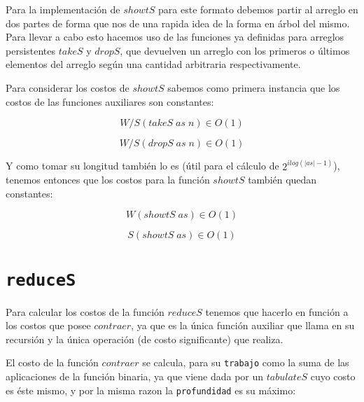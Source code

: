 \documentclass[a4paper,10pt]{article}
\begin{document}
    Para la implementación de $showtS$ para este formato debemos partir al arreglo
en dos partes de forma que nos de una rapida idea de la forma en árbol del mismo.
Para llevar a cabo esto hacemos uso de las funciones ya definidas para arreglos 
persistentes $takeS$ y $dropS$, que devuelven un arreglo con los primeros o últimos
elementos del arreglo según una cantidad arbitraria respectivamente.

    Para considerar los costos de $showtS$ sabemos como primera instancia que los
costos de las funciones auxiliares son constantes:

\begin{equation*}
    W/S \left( takeS\; as\; n \right) \in 
    O \left( 1 \right)
\end{equation*}

\begin{equation*}
    W/S \left( dropS\; as\; n \right) \in 
    O \left( 1 \right)
\end{equation*}

\bigskip
   
    Y como tomar su longitud también lo es (útil para el cálculo de 
$2^{ilog(\vert as \vert -1)}$), tenemos entonces que los costos para la función
$showtS$ también quedan constantes:

\begin{equation*}
    W \left( showtS\; as \right) \in O \left( 1 \right)
\end{equation*}

\begin{equation*}
    S \left( showtS\; as \right) \in O \left( 1 \right)
\end{equation*}


\bigskip
    

\section*{\texttt{reduceS}}

    Para calcular los costos de la función $reduceS$ tenemos que hacerlo en función
a los costos que posee $contraer$, ya que es la única función auxiliar que llama en
su recursión y la única operación (de costo significante) que realiza.

    El costo de la función $contraer$ se calcula, para su \texttt{trabajo} como
la suma de las aplicaciones de la función binaria, ya que viene dada por un $tabulateS$
cuyo costo es éste mismo, y por la misma razon la \texttt{profundidad} es su
máximo:
\end{document}
